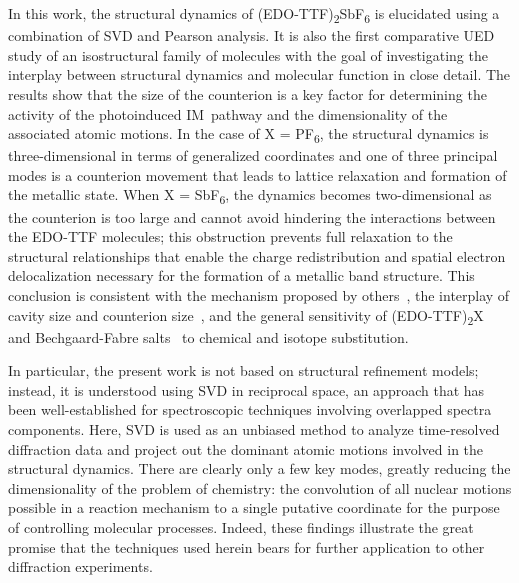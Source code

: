 In this work, the structural dynamics of (EDO-TTF)\textsubscript{2}SbF\textsubscript{6} is
elucidated using a combination of SVD and Pearson analysis.
It is also the first comparative UED study of an isostructural family of molecules
with the goal of investigating the interplay between structural dynamics and molecular function
in close detail. The results show that the size of the counterion is a key factor for
determining the activity of the photoinduced IM~pathway and the dimensionality of
the associated atomic motions.
%
In the case of X = PF\textsubscript{6}, the structural dynamics is three-dimensional
in terms of generalized coordinates and one of three principal modes is
a counterion movement that leads to lattice relaxation and formation of the metallic state.
When X = SbF\textsubscript{6}, the dynamics becomes two-dimensional as the counterion is too large
and cannot avoid hindering the interactions between the EDO-TTF molecules;
this obstruction prevents full relaxation to the structural relationships
that enable the charge redistribution and spatial electron delocalization
necessary for the formation of a metallic band structure.
%
This conclusion is consistent with the mechanism proposed by others~\cite{Servol2015},
the interplay of cavity size and counterion size~\cite{Kistenmacher1984},
and the general sensitivity of (EDO-TTF)\textsubscript{2}X~\cite{Nakano2008, Nakano2009, NakanoX, Ishikawa2014}
and Bechgaard-Fabre salts~\cite{Kohler2011, Dressel2012, Pouget2018} to chemical and
isotope substitution.

In particular, the present work is not based on structural refinement models;
instead, it is understood using SVD in reciprocal space, an approach that has been
well-established for spectroscopic techniques involving overlapped spectra components.
Here, SVD is used as an unbiased method to analyze time-resolved diffraction data and
project out the dominant atomic motions involved in the structural dynamics.
%
There are clearly only a few key modes, greatly reducing the dimensionality of
the problem of chemistry:
the convolution of all nuclear motions possible in a reaction mechanism
to a single putative coordinate for the purpose of controlling molecular processes.
%
Indeed, these findings illustrate the great promise that the techniques used herein
bears for further application to other diffraction experiments.



